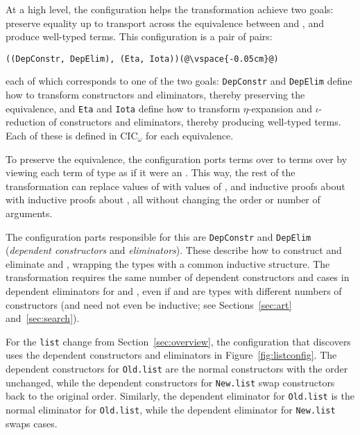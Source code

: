 At a high level, the configuration helps the transformation achieve two goals: preserve equality up to transport across the equivalence 
between \A and \B, and produce well-typed terms.
This configuration is a pair of pairs:

\begin{lstlisting}
((DepConstr, DepElim), (Eta, Iota))(@\vspace{-0.05cm}@)
\end{lstlisting}
each of which corresponds to one of the two goals:
\lstinline{DepConstr} and \lstinline{DepElim} define how to transform constructors and eliminators, thereby preserving the equivalence, and 
\lstinline{Eta} and \lstinline{Iota} define how to transform $\eta$-expansion and $\iota$-reduction of constructors and eliminators, thereby producing well-typed terms.
Each of these is defined in CIC$_{\omega}$ for each equivalence.


To preserve the equivalence, the configuration ports terms over \A to terms over \B by viewing each
term of type \B as if it were an \A.
This way, the rest of the transformation can replace values of \A with values of \B, and
inductive proofs about \A with inductive proofs about \B, %
all without changing the order or number of arguments.

The configuration parts responsible for this are \lstinline{DepConstr}
and \lstinline{DepElim} (\textit{dependent constructors} and \textit{eliminators}).
These describe how to construct and eliminate \A and \B, wrapping the types with a common inductive structure.
The transformation requires the same number of dependent constructors and cases in dependent eliminators for \A and \B,
even if \A and \B are types with different numbers of constructors
(\A and \B need not even be inductive; see Sections~\ref{sec:art} and~\ref{sec:search}).

For the \lstinline{list} change from Section~\ref{sec:overview},
the configuration that \toolname discovers uses the dependent constructors
and eliminators in Figure~\ref{fig:listconfig}. The dependent constructors for \lstinline{Old.list}
are the normal constructors with the order unchanged,
while the dependent constructors for \lstinline{New.list} swap constructors
back to the original order.
Similarly, the dependent eliminator for \lstinline{Old.list} is the normal eliminator for \lstinline{Old.list},
while the dependent eliminator for \lstinline{New.list} swaps cases.

